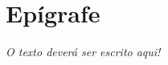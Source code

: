 \chapter*{Epígrafe}

\begin{epigrafe}

\vspace*{\fill}
\begin{flushright}

    \textit{O texto deverá ser escrito aqui!}

\end{flushright}

\end{epigrafe}